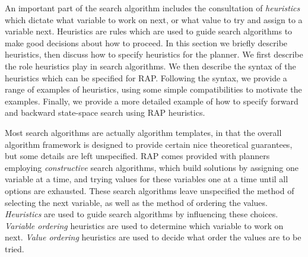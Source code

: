 








An
important part of the search algorithm includes the consultation of
{\em heuristics} which dictate what variable to work on next, or what
value to try and assign to a variable next.  Heuristics are rules
which are used to guide search algorithms to make good decisions about
how to proceed.  In this section we briefly describe heuristics, then
discuss how to specify heuristics for the planner.
We first describe the role heuristics play in search algorithms.
We then describe the syntax of the heuristics which can be specified
for RAP.  Following the syntax, we provide a range of examples of
heuristics, using some simple compatibilities to motivate the examples.
Finally, we provide a more detailed example of how to specify forward
and backward state-space search using RAP heuristics.
  

Most search algorithms are actually algorithm templates, in that the
overall algorithm framework is designed to provide certain nice
theoretical guarantees, but some details are left unspecified.  RAP
comes provided with planners employing {\em constructive} search
algorithms, which build solutions by assigning one variable at a time,
and trying values for these variables one at a time until all options
are exhausted.  These search algorithms leave unspecified the method
of selecting the next variable, as well as the method of ordering
the values.  {\em Heuristics} are used to guide search algorithms by
influencing these choices.  {\em Variable ordering} heuristics are
used to determine which variable to work on next.  {\em Value ordering}
heuristics are used to decide what order the values are to be tried.

